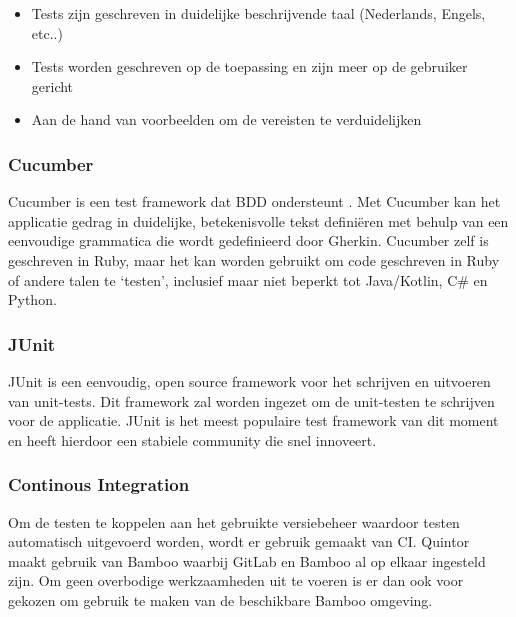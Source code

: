 \begin{itemize}[noitemsep]
    \item Tests zijn geschreven in duidelijke beschrijvende taal (Nederlands, Engels, etc..)
    \item Tests worden geschreven op de toepassing en zijn meer op de gebruiker gericht
    \item Aan de hand van voorbeelden om de vereisten te verduidelijken
\end{itemize}

\subsubsection*{Cucumber}
Cucumber is een test framework dat BDD ondersteunt \citep{wynne2017cucumber}. Met Cucumber kan het applicatie gedrag in duidelijke, betekenisvolle tekst definiëren met behulp van een eenvoudige grammatica die wordt gedefinieerd door Gherkin. Cucumber zelf is geschreven in Ruby, maar het kan worden gebruikt om code geschreven in Ruby of andere talen te `testen', inclusief maar niet beperkt tot Java/Kotlin, C\# en Python.

\subsubsection{JUnit}
JUnit is een eenvoudig, open source framework voor het schrijven en uitvoeren van unit-tests. Dit framework zal worden ingezet om de unit-testen te schrijven voor de applicatie. JUnit is het meest populaire test framework van dit moment en heeft hierdoor een stabiele community die snel innoveert. 

\subsubsection{Continous Integration}

Om de testen te koppelen aan het gebruikte versiebeheer waardoor testen automatisch uitgevoerd worden, wordt er gebruik gemaakt van \acrfull{CI}. Quintor maakt gebruik van Bamboo waarbij GitLab en Bamboo al op elkaar ingesteld zijn. Om geen overbodige werkzaamheden uit te voeren is er dan ook voor gekozen om gebruik te maken van de beschikbare Bamboo omgeving.

